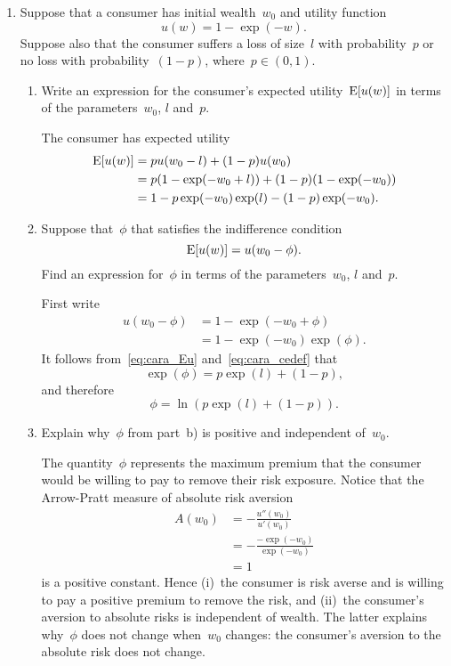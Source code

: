 \begin{enumerate}
\begin{enumerate}
	\end{enumerate}

	\item
	Suppose that a consumer has initial wealth~$w_0$ and utility function
	\[ u(w)=1-\exp(-w). \]
	Suppose also that the consumer suffers a loss of size~$l$ with probability~$p$ or no loss with probability~$(1-p)$, where~$p\in(0,1)$.
	\begin{enumerate}

		\item
		Write an expression for the consumer's expected utility~$\operatorname{E}[u(w)]$ in terms of the parameters~$w_0$, $l$ and~$p$.
		\begin{solution}
			The consumer has expected utility
			\begin{align}
				\operatorname{E}[u(w)]
				&= pu(w_0-l)+(1-p)u(w_0)\\
				&= p(1-\exp(-w_0+l))+(1-p)(1-\exp(-w_0))\\
				&= 1-p\exp(-w_0)\exp(l)-(1-p)\exp(-w_0).
					\label{eq:cara_Eu}
			\end{align}
		\end{solution}

		\item
		Suppose that~$\phi$ that satisfies the indifference condition
		\[ \operatorname{E}[u(w)]=u(w_0-\phi). \label{eq:cara_cedef} \]
		Find an expression for~$\phi$ in terms of the parameters~$w_0$, $l$ and~$p$.
		\begin{solution}
			First write
			\begin{align}
				u(w_0-\phi)
				&= 1-\exp(-w_0+\phi)\\
				&= 1-\exp(-w_0)\exp(\phi).
			\end{align}
			It follows from~\eqref{eq:cara_Eu} and~\eqref{eq:cara_cedef} that
			\[ \exp(\phi)=p\exp(l)+(1-p), \]
			and therefore
			\[ \phi=\ln(p\exp(l)+(1-p)). \]
		\end{solution}

		\item
		Explain why~$\phi$ from part~b) is positive and independent of~$w_0$.
		\begin{solution}
			The quantity~$\phi$ represents the maximum premium that the consumer would be willing to pay to remove their risk exposure.
			Notice that the Arrow-Pratt measure of absolute risk aversion
			\begin{align}
				A(w_0)
				&= -\frac{u''(w_0)}{u'(w_0)}\\
				&= -\frac{-\exp(-w_0)}{\exp(-w_0)}\\
				&= 1
			\end{align}
			is a positive constant.
			Hence
			(i)~the consumer is risk averse and is willing to pay a positive premium to remove the risk, and
			(ii)~the consumer's aversion to absolute risks is independent of wealth.
			The latter explains why~$\phi$ does not change when~$w_0$ changes: the consumer's aversion to the absolute risk does not change.
		\end{solution}

	\end{enumerate}

\end{enumerate}

